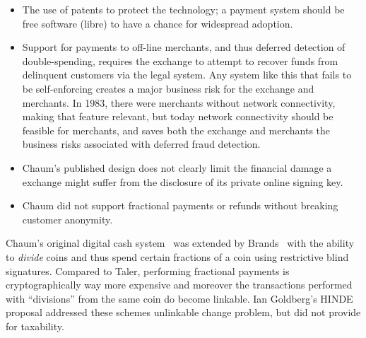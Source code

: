 \documentclass{llncs}
\begin{document}
\begin{itemize}
 \item The use of patents to protect the technology; a payment system
   should be free software (libre) to have a chance for widespread adoption.
 \item Support for payments to off-line merchants, and thus deferred
   detection of double-spending, requires the exchange to attempt to
   recover funds from delinquent customers via the legal system.  
   Any system like this that fails to be self-enforcing creates a major
   business risk for the exchange and merchants.  
   In 1983, there were merchants without network connectivity, making that
   feature relevant, but today network connectivity should be feasible for
   merchants, and saves both the exchange and merchants the business risks
   associated with deferred fraud detection.
 \item %
   Chaum's published design does not clearly
   limit the financial damage a exchange might suffer from the
   disclosure of its private online signing key.
 \item Chaum did not support fractional payments or refunds without
   breaking customer anonymity.
\end{itemize}

Chaum's original digital cash system~\cite{chaum1983blind} was
extended by Brands~\cite{brands1993efficient} with the ability to {\em
  divide} coins and thus spend certain fractions of a coin using
restrictive blind signatures.  Compared to Taler, performing
fractional payments is cryptographically way more expensive and
moreover the transactions performed with ``divisions'' from the same
coin do become linkable.
%
%
Ian Goldberg's HINDE proposal addressed these schemes unlinkable change
problem, but did not provide for taxability. 
\end{document}
